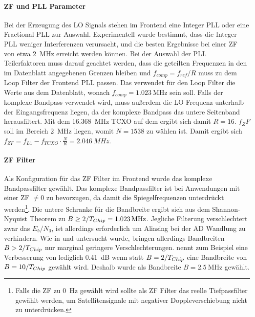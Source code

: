 
\paragraph{ZF und PLL Parameter}
Bei der Erzeugung des LO Signals stehen im Frontend eine Integer PLL oder eine Fractional PLL zur Auswahl. Experimentell wurde bestimmt, dass die Integer PLL weniger Interferenzen verursacht, und die besten Ergebnisse bei einer ZF von etwa \SI{2}{\MHz} erreicht werden können. Bei der Auswahl der PLL Teilerfaktoren muss darauf geachtet werden, dass die geteilten Frequenzen in den im Datenblatt \cite{max2769} angegebenen Grenzen bleiben und $f_{comp}=f_{ref}/R$ muss zu dem Loop Filter der Frontend PLL passen. Das \comboard verwendet für den Loop Filter die Werte aus dem Datenblatt, wonach $f_{comp}=\SI{1.023}{\MHz}$ sein soll. Falls der komplexe Bandpass verwendet wird, muss außerdem die LO Frequenz unterhalb der Eingangsfrequenz liegen, da der komplexe Bandpass das untere Seitenband herausfiltert.
Mit dem \SI{16.368}{MHz} \gls{TCXO} auf dem \comboard ergibt sich damit $R=16$. $f_ZF$ soll im Bereich \SI{2}{\MHz} liegen, womit $N=1538$ zu wählen ist. Damit ergibt sich $f_{ZF}=f_{L1}-f_{TCXO}\cdot \frac{N}{R}=\SI{2.046}{MHz}$.

\paragraph{ZF Filter}
Als Konfiguration für das ZF Filter im Frontend wurde das komplexe Bandpassfilter gewählt. Das komplexe Bandpassfilter ist bei Anwendungen mit einer ZF $\neq 0$ zu bevorzugen, da damit die Spiegelfrequenzen unterdrückt werden\footnote{Falls die ZF zu \SI{0}{\Hz} gewählt wird sollte als ZF Filter das reelle Tiefpassfilter gewählt werden, um Satellitensignale mit negativer Doppleverschiebung nicht zu unterdrücken.}. Die untere Schranke für die Bandbreite ergibt sich aus dem Shannon-Nyquist Theorem zu $B\geq 2/\gpsTchip=\SI{1.023}{\MHz}$. Jegliche Filterung verschlechtert zwar das $E_b/N_0$, ist allerdings erforderlich um Aliasing bei der AD Wandlung zu verhindern. Wie in \cite{hegarty2011analytical} und \cite{itc1982chang} untersucht wurde, bringen allerdings Bandbreiten $B>2/{T}_{Chip}$ nur marginal geringere Verschlechterungen. \cite{hegarty2011analytical} nennt zum Beispiel eine Verbesserung von lediglich \SI{0.41}{\dB} wenn statt $B=2/{T}_{Chip}$ eine Bandbreite von $B=10/{T}_{Chip}$ gewählt wird. Deshalb wurde als Bandbreite $B=\SI{2.5}{\MHz}$ gewählt.

